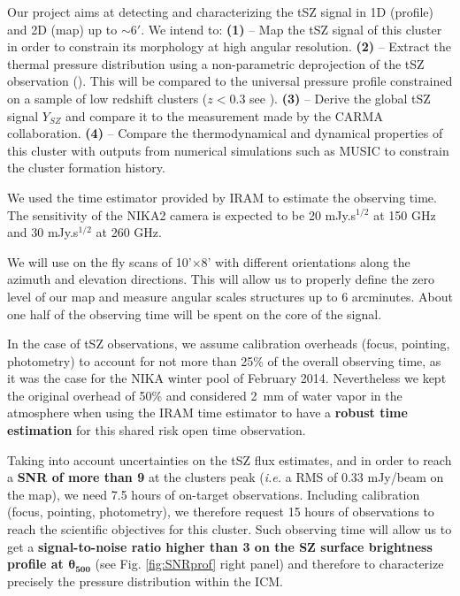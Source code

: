 \documentclass[11pt,a4paper,twoside,graphicx,color]{article}
\begin{document}
Our project aims at detecting and characterizing the tSZ signal in 1D (profile) and 2D (map) up to $\sim 6'$. We intend to: \textbf{(1)} – Map the tSZ signal of this cluster in order to constrain its morphology at high angular resolution. \textbf{(2)} – Extract the thermal pressure distribution using a non-parametric deprojection of the tSZ observation (\cite{rup16}). This will be compared to the universal pressure profile constrained on a sample of low redshift clusters ($z < 0.3$ see \cite{arn10}). \textbf{(3)} – Derive the global tSZ signal $Y_{SZ}$ and compare it to the measurement made by the CARMA collaboration. \textbf{(4)} – Compare the thermodynamical and dynamical properties of this cluster with outputs from numerical simulations such as MUSIC \cite{sem14} to constrain the cluster formation history.

We used the time estimator provided by IRAM to estimate the observing time. The sensitivity of the NIKA2 camera is expected to be 20 mJy.s$^{1/2}$ at 150 GHz and 30 mJy.s$^{1/2}$ at 260 GHz. 

We will use on the fly scans of 10'$\times$8' with different orientations along the azimuth and elevation directions. This will allow us to properly define the zero level of our map and measure angular scales structures up to 6 arcminutes. About one half of the observing time will be spent on the core of the signal. 

In the case of tSZ observations, we assume calibration overheads (focus, pointing, photometry) to account for not more than 25\% of the overall observing time, as it was the case for the NIKA winter pool of February 2014. Nevertheless we kept the original overhead of 50\% and considered 2~mm of water vapor in the atmosphere when using the IRAM time estimator to have a \textbf{robust time estimation} for this shared risk open time observation.

Taking into account uncertainties on the tSZ flux estimates, and in order to reach a {\bf SNR of more than 9} at the clusters peak ({\it i.e.} a RMS of 0.33 mJy/beam on the map), we need 7.5 hours of on-target observations. Including calibration (focus, pointing, photometry), we therefore request 15 hours of observations to reach the scientific objectives for this cluster. Such observing time will allow us to get a \textbf{signal-to-noise ratio higher than 3 on the SZ surface brightness profile at $\mathbf{\theta_{500}}$} (see Fig. \ref{fig:SNRprof} right panel) and therefore to characterize precisely the pressure distribution within the ICM.
\end{document}
